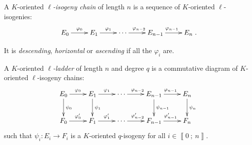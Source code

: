 \documentclass[10pt]{beamer}
\theoremstyle{plain}
\theoremstyle{definition}
\newcommand{\Z}{\mathbb{Z}}
\newcommand{\mO}{\mathcal{O}}
\renewcommand{\i}[2]{\left\llbracket #1~;~#2\right\rrbracket}
\renewcommand{\(}{\left(}
\renewcommand{\)}{\right)}
\newcommand{\mf}[1]{\mathfrak{#1}}
\begin{document}
\begin{frame}

\begin{definition}
A $K$-oriented \emph{$\ell$-isogeny chain} of length $n$ is a sequence of $K$-oriented $\ell$-isogenies:
\[\xymatrix{
E_0 \ar[r]^{\varphi_0} & E_1 \ar[r]^{\varphi_{1}}& \cdots \ar[r]^{\varphi_{n-2}} & E_{n-1} \ar[r]^{\varphi_{n-1}} & E_n
}.\]

It is \emph{descending}, \emph{horizontal} or \emph{ascending} if all the $\varphi_i$ are.

\pause

A $K$-oriented \emph{$\ell$-ladder} of length $n$ and degree $q$ is a commutative diagram of $K$-oriented $\ell$-isogeny chains:
\[\xymatrix{
E_0 \ar[d]^{\psi_0} \ar[r]^{\varphi_0} & E_1\ar[d]^{\psi_1} \ar[r]^{\varphi_{1}}& \cdots \ar[r]^{\varphi_{n-2}} & E_{n-1} \ar[d]^{\psi_{n-1}} \ar[r]^{\varphi_{n-1}} & E_n \ar[d]^{\psi_n}\\
F_0 \ar[r]^{\varphi'_0} & F_1 \ar[r]^{\varphi'_{1}}& \cdots \ar[r]^{\varphi'_{n-2}} & F_{n-1} \ar[r]^{\varphi'_{n-1}} & F_n
}\]
such that $\psi_i : E_i\longrightarrow F_i$ is a $K$-oriented $q$-isogeny for all $i\in\i{0}{n}$.
\end{definition}

\end{frame}



\end{document}
